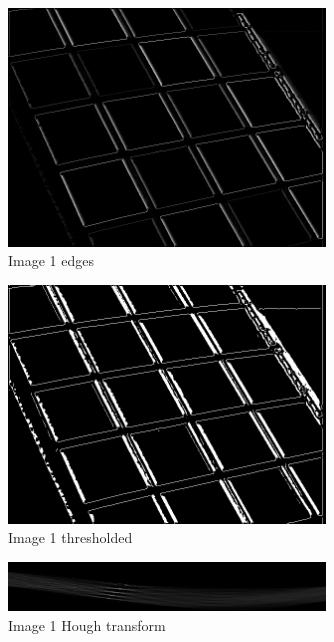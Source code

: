 \documentclass[12pt]{article}
\begin{document}
\subsection{}
\begin{figure}[H] \centering \includegraphics[page=1,width=0.75\textwidth]{img01_01edge}
\caption{Image 1 edges}    \end{figure}   
\begin{figure}[H] \centering \includegraphics[page=1,width=0.75\textwidth]{img01_02threshold}
\caption{Image 1 thresholded}    \end{figure}   
\begin{figure}[H] \centering \includegraphics[page=1,width=0.75\textwidth]{img01_03hough}
\caption{Image 1 Hough transform}    \end{figure}   
\end{document}
